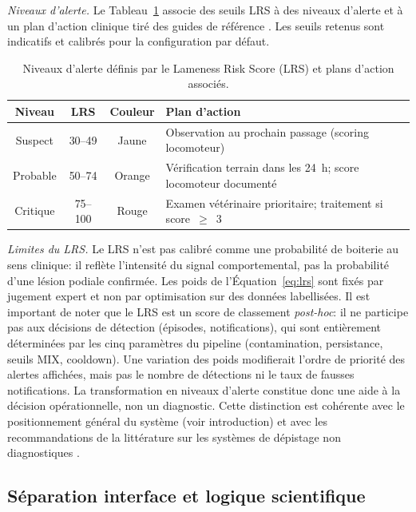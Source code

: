 \textit{Niveaux d'alerte.}
Le Tableau~\ref{tab:niveaux_alerte} associe des seuils LRS à des niveaux d'alerte et à
un plan d'action clinique tiré des guides de référence
\citep{sprecher1997lameness,ahdb_mobility_scoring_dairy_cows,dairynz_preventing_managing_lameness_guide_2025}.
Les seuils retenus sont indicatifs et calibrés pour la configuration par défaut.

\begin{table}[H]
    \centering
    \small
    \caption{Niveaux d'alerte définis par le Lameness Risk Score (LRS) et plans d'action
    associés.}
    \label{tab:niveaux_alerte}
    \begin{tabular}{cccp{5.5cm}}
        \toprule
        \textbf{Niveau} & \textbf{LRS} & \textbf{Couleur} & \textbf{Plan d'action} \\
        \midrule
        Suspect  & 30--49 & Jaune & Observation au prochain passage (scoring locomoteur) \\
        Probable & 50--74 & Orange & Vérification terrain dans les 24~h; score locomoteur documenté \\
        Critique & 75--100 & Rouge & Examen vétérinaire prioritaire; traitement si score~$\geq$~3 \\
        \bottomrule
    \end{tabular}
\end{table}

\textit{Limites du LRS.}
Le LRS n'est pas calibré comme une probabilité de boiterie au sens clinique: il
reflète l'intensité du signal comportemental, pas la probabilité d'une lésion podiale
confirmée. Les poids de l'Équation~\ref{eq:lrs} sont fixés par jugement expert et non
par optimisation sur des données labellisées. Il est important de noter que le LRS est
un score de classement \textit{post-hoc}: il ne participe pas aux décisions de
détection (épisodes, notifications), qui sont entièrement déterminées par les cinq
paramètres du pipeline (contamination, persistance, seuils MIX, cooldown). Une
variation des poids modifierait l'ordre de priorité des alertes affichées, mais pas
le nombre de détections ni le taux de fausses notifications. La transformation en
niveaux d'alerte constitue donc une aide à la décision opérationnelle, non un
diagnostic. Cette distinction est cohérente avec le positionnement général du système
(voir introduction) et avec les recommandations de la littérature sur
les systèmes de dépistage non diagnostiques \citep{alsaaod2019automatic}.

\subsection{Séparation interface et logique scientifique}


